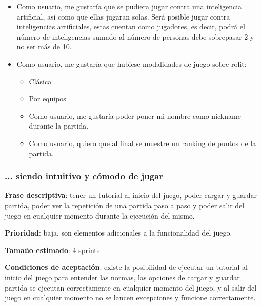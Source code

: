\documentclass[../../FINAL/Scrum/SCRUM.tex]{subfiles}
\begin{document}
\begin{itemize}
\item  Como usuario, me gustaría que se pudiera jugar contra una inteligencia artificial, así como que ellas jugaran solas. 
    Será posible jugar contra inteligencias artificiales, estas cuentan como jugadores, es decir, podrá el número de inteligencias sumado al número de personas debe sobrepasar 2 y no ser más de 10.

\item Como usuario, me gustaría que hubiese modalidades de juego sobre rolit:
\begin{itemize}
	\item  Clásica 
     \item  Por equipos 
     \item Como usuario, me gustaría poder poner mi nombre como nickname durante la partida.
     \item Como usuario, quiero que al final se muestre un ranking de puntos de la partida.
\end{itemize}
\end{itemize}


\subsubsection{... siendo intuitivo y cómodo de jugar}
\textbf{Frase descriptiva}: tener un tutorial al inicio del juego, poder cargar y guardar partida, poder ver la repetición de una partida paso a paso y poder salir del juego en cualquier momento durante la ejecución del mismo.

\textbf{Prioridad}: baja, son elementos adicionales a la funcionalidad del juego.

\textbf{Tamaño estimado}: 4 sprints

\textbf{Condiciones de aceptación}: existe la posibilidad de ejecutar un tutorial al inicio del juego para entender las normas, las opciones de cargar y guardar partida se ejecutan correctamente en cualquier momento del juego, y al salir del juego en cualquier momento no se lancen excepciones y funcione correctamente.
\end{document}
